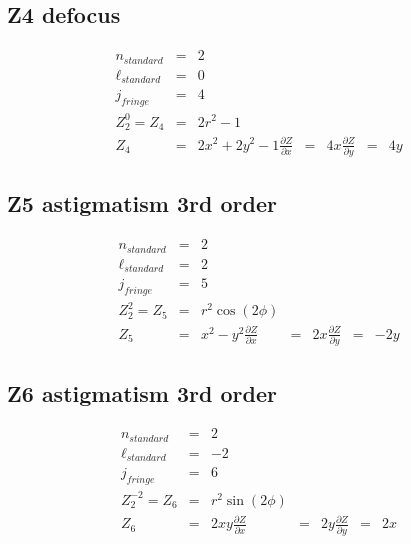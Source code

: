 \documentclass[10pt]{article}
\begin{document}
  \subsection{Z4 defocus}
    \begin{subequations}
    \begin{eqnarray}
        n_{standard} &=&2\\
        \ell_{standard} &=&0\\
        j_{fringe} &=&4\\
        Z_{2}^{0} = Z_{4} &=& 2 r^{2} - 1\\
        Z_{4} &=& 2 x^{2} + 2 y^{2} - 1
        \frac{\partial Z}{\partial x} &=& 4 x
        \frac{\partial Z}{\partial y} &=& 4 y
    \end{eqnarray}
    \end{subequations}
  \subsection{Z5 astigmatism 3rd order}
    \begin{subequations}
    \begin{eqnarray}
        n_{standard} &=&2\\
        \ell_{standard} &=&2\\
        j_{fringe} &=&5\\
        Z_{2}^{2} = Z_{5} &=& r^{2} \cos{\left(2 \phi \right)}\\
        Z_{5} &=& x^{2} - y^{2}
        \frac{\partial Z}{\partial x} &=& 2 x
        \frac{\partial Z}{\partial y} &=& - 2 y
    \end{eqnarray}
    \end{subequations}
  \subsection{Z6 astigmatism 3rd order}
    \begin{subequations}
    \begin{eqnarray}
        n_{standard} &=&2\\
        \ell_{standard} &=&-2\\
        j_{fringe} &=&6\\
        Z_{2}^{-2} = Z_{6} &=& r^{2} \sin{\left(2 \phi \right)}\\
        Z_{6} &=& 2 x y
        \frac{\partial Z}{\partial x} &=& 2 y
        \frac{\partial Z}{\partial y} &=& 2 x
    \end{eqnarray}
    \end{subequations}
\end{document}
